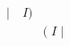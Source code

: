 \documentclass[preview]{standalone}
\begin{document}
\begin{align*}
\big| \quad I ) \\ &(\;I \; \big| \;
\end{align*}
\end{document}
